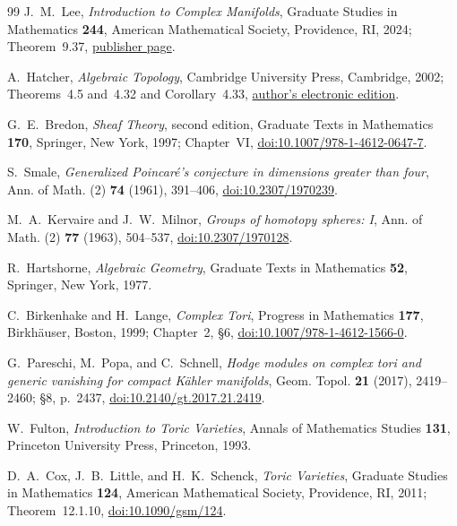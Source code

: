 \begin{thebibliography}{99}
J.~M.~Lee,
\emph{Introduction to Complex Manifolds},
Graduate Studies in Mathematics \textbf{244}, American Mathematical Society,
Providence, RI, 2024; Theorem~9.37,
\href{https://bookstore.ams.org/gsm-244}{publisher page}.

A.~Hatcher,
\emph{Algebraic Topology},
Cambridge University Press, Cambridge, 2002; Theorems~4.5 and~4.32 and
Corollary~4.33,
\href{https://pi.math.cornell.edu/~hatcher/AT/ATpage.html}{author's electronic edition}.

G.~E.~Bredon,
\emph{Sheaf Theory}, second edition,
Graduate Texts in Mathematics \textbf{170}, Springer, New York, 1997;
Chapter~VI,
\href{https://doi.org/10.1007/978-1-4612-0647-7}{doi:10.1007/978-1-4612-0647-7}.

S.~Smale,
\emph{Generalized Poincar\'e's conjecture in dimensions greater than four},
Ann. of Math. (2) \textbf{74} (1961), 391--406,
\href{https://doi.org/10.2307/1970239}{doi:10.2307/1970239}.

M.~A.~Kervaire and J.~W.~Milnor,
\emph{Groups of homotopy spheres: I},
Ann. of Math. (2) \textbf{77} (1963), 504--537,
\href{https://doi.org/10.2307/1970128}{doi:10.2307/1970128}.

R.~Hartshorne,
\emph{Algebraic Geometry},
Graduate Texts in Mathematics \textbf{52}, Springer, New York, 1977.

C.~Birkenhake and H.~Lange,
\emph{Complex Tori},
Progress in Mathematics \textbf{177}, Birkh\"auser, Boston, 1999;
Chapter~2, \S6,
\href{https://doi.org/10.1007/978-1-4612-1566-0}{doi:10.1007/978-1-4612-1566-0}.

G.~Pareschi, M.~Popa, and C.~Schnell,
\emph{Hodge modules on complex tori and generic vanishing for compact
K\"ahler manifolds},
Geom. Topol. \textbf{21} (2017), 2419--2460; \S8, p.~2437,
\href{https://doi.org/10.2140/gt.2017.21.2419}{doi:10.2140/gt.2017.21.2419}.

W.~Fulton,
\emph{Introduction to Toric Varieties},
Annals of Mathematics Studies \textbf{131}, Princeton University Press,
Princeton, 1993.

D.~A.~Cox, J.~B.~Little, and H.~K.~Schenck,
\emph{Toric Varieties},
Graduate Studies in Mathematics \textbf{124}, American Mathematical Society,
Providence, RI, 2011; Theorem~12.1.10,
\href{https://doi.org/10.1090/gsm/124}{doi:10.1090/gsm/124}.


\end{thebibliography}
